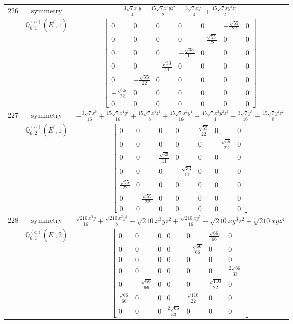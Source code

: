 \documentclass[fleqn,8pt,landscape]{jsarticle}
\begin{document}
\begin{longtable}{ccc}
$ 226 $ & $ \text{symmetry} $ & $ \frac{3 \sqrt{7} x^{5} y}{4} - \frac{15 \sqrt{7} x^{3} y z^{2}}{2} - \frac{3 \sqrt{7} x y^{5}}{4} + \frac{15 \sqrt{7} x y^{3} z^{2}}{2} $ \\
$  $ & $ \mathbb{Q}_{6,1}^{(a)}(E^{\prime},1) $ & $ \begin{bmatrix} 0 & 0 & 0 & 0 & 0 & - \frac{\sqrt{55}}{22} & 0 \\ 0 & 0 & 0 & 0 & - \frac{\sqrt{55}}{22} & 0 & 0 \\ 0 & 0 & 0 & - \frac{\sqrt{33}}{11} & 0 & 0 & 0 \\ 0 & 0 & - \frac{\sqrt{33}}{11} & 0 & 0 & 0 & 0 \\ 0 & - \frac{\sqrt{55}}{22} & 0 & 0 & 0 & 0 & 0 \\ - \frac{\sqrt{55}}{22} & 0 & 0 & 0 & 0 & 0 & 0 \\ 0 & 0 & 0 & 0 & 0 & 0 & 0 \end{bmatrix} $ \\ \hline
$ 227 $ & $ \text{symmetry} $ & $ - \frac{3 \sqrt{7} x^{6}}{16} + \frac{15 \sqrt{7} x^{4} y^{2}}{16} + \frac{15 \sqrt{7} x^{4} z^{2}}{8} + \frac{15 \sqrt{7} x^{2} y^{4}}{16} - \frac{45 \sqrt{7} x^{2} y^{2} z^{2}}{4} - \frac{3 \sqrt{7} y^{6}}{16} + \frac{15 \sqrt{7} y^{4} z^{2}}{8} $ \\
$  $ & $ \mathbb{Q}_{6,2}^{(a)}(E^{\prime},1) $ & $ \begin{bmatrix} 0 & 0 & 0 & 0 & \frac{\sqrt{55}}{22} & 0 & 0 \\ 0 & 0 & 0 & 0 & 0 & - \frac{\sqrt{55}}{22} & 0 \\ 0 & 0 & \frac{\sqrt{33}}{11} & 0 & 0 & 0 & 0 \\ 0 & 0 & 0 & - \frac{\sqrt{33}}{11} & 0 & 0 & 0 \\ \frac{\sqrt{55}}{22} & 0 & 0 & 0 & 0 & 0 & 0 \\ 0 & - \frac{\sqrt{55}}{22} & 0 & 0 & 0 & 0 & 0 \\ 0 & 0 & 0 & 0 & 0 & 0 & 0 \end{bmatrix} $ \\ \hline
$ 228 $ & $ \text{symmetry} $ & $ \frac{\sqrt{210} x^{5} y}{16} + \frac{\sqrt{210} x^{3} y^{3}}{8} - \sqrt{210} x^{3} y z^{2} + \frac{\sqrt{210} x y^{5}}{16} - \sqrt{210} x y^{3} z^{2} + \sqrt{210} x y z^{4} $ \\
$  $ & $ \mathbb{Q}_{6,1}^{(a)}(E^{\prime},2) $ & $ \begin{bmatrix} 0 & 0 & 0 & 0 & 0 & \frac{\sqrt{66}}{66} & 0 \\ 0 & 0 & 0 & 0 & - \frac{\sqrt{66}}{66} & 0 & 0 \\ 0 & 0 & 0 & 0 & 0 & 0 & 0 \\ 0 & 0 & 0 & 0 & 0 & 0 & \frac{2 \sqrt{66}}{33} \\ 0 & - \frac{\sqrt{66}}{66} & 0 & 0 & 0 & \frac{\sqrt{110}}{22} & 0 \\ \frac{\sqrt{66}}{66} & 0 & 0 & 0 & \frac{\sqrt{110}}{22} & 0 & 0 \\ 0 & 0 & 0 & \frac{2 \sqrt{66}}{33} & 0 & 0 & 0 \end{bmatrix} $ \\ \hline

\end{longtable}
\end{document}
